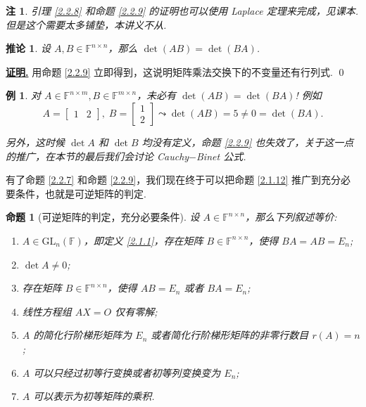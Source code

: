 \documentclass[10pt,openany]{article}
\theoremstyle{thmstyle} %
\theoremstyle{defstyle} %
\newtheorem{corollary}[theorem]{推论}
\theoremstyle{prostyle} %
\newtheorem{proposition}[theorem]{命题}
\theoremstyle{exastyle}
\newtheorem{example}[theorem]{例}
\theoremstyle{remstyle}
\newtheorem{remark}[theorem]{注}
\renewenvironment{proof}[1][证明]{\par\underline{\textbf{#1.}} \;\fangsong}{\qed\par}
\newcommand{\F}{\mathbb{F}}
\newcommand{\gf}{\text{GL}_n(\mathbb{F})}
\newcommand{\n}{^{n \times n}}
\newcommand{\mn}{^{m \times n}}
\newcommand{\nm}{^{n \times m}}
\begin{document}
\begin{remark}
	引理 \ref{2.2.8} 和命题 \ref{2.2.9} 的证明也可以使用 Laplace 定理来完成，见课本. 但是这个需要太多铺垫，本讲义不从.
\end{remark}

\begin{corollary}
	设 \( A,B \in \F\n \)，那么 \( \det(AB)=\det(BA) \).
\end{corollary}

\begin{proof}
	用命题 \ref{2.2.9} 立即得到，这说明矩阵乘法交换下的不变量还有行列式.
\end{proof}

\begin{example}
	对 \( A \in \F\nm, B \in \F\mn \)，未必有 \( \det(AB)=\det(BA) \)! 例如
	\[ A= \begin{bmatrix}
		1 & 2
	\end{bmatrix}, \; B=\begin{bmatrix}
	1 \\ 2
	\end{bmatrix} \leadsto \det(AB)=5 \neq 0=\det(BA). \]
	
	 另外，这时候 \( \det A \) 和 \( \det B \) 均没有定义，命题 \ref{2.2.9} 也失效了，关于这一点的推广，在本节的最后我们会讨论 Cauchy\(-\)Binet 公式.
\end{example}

有了命题 \ref{2.2.7} 和命题 \ref{2.2.9}，我们现在终于可以把命题 \ref{2.1.12} 推广到充分必要条件，也就是可逆矩阵的判定.

\begin{proposition}[可逆矩阵的判定，充分必要条件]
	设 \( A \in \F\n \)，那么下列叙述等价:
	\begin{enumerate}[(1)]
		\item \( A \in \gf \)，即定义 \ref{2.1.1}，存在矩阵 \( B \in \F\n \)，使得 \( BA=AB=E_n \);
		\item \( \det A \neq 0 \);
		\item 存在矩阵 \( B \in \F\n \)，使得 \( AB=E_n \) 或者 \( BA=E_n \);
		\item 线性方程组 \( AX=O \) 仅有零解;
		\item \( A \) 的简化行阶梯形矩阵为 \( E_n \) 或者简化行阶梯形矩阵的非零行数目 \( r(A)=n \);
		\item \( A \) 可以只经过初等行变换或者初等列变换变为 \( E_n \);
		\item \( A \) 可以表示为初等矩阵的乘积.
	\end{enumerate}
	\label{2.2.13}
\end{proposition}
\end{document}
